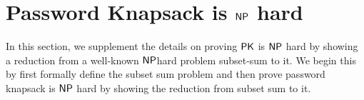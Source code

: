 \vspace{-0.3cm}

\vspace{-0.2in}
\section{Password Knapsack is $\mathsf{NP}$ hard}\label{appendix:pkhardness}

In this section, we supplement the details on proving $\mathsf{PK}$ is $\mathsf{NP}$ hard by showing a reduction from a well-known $\mathsf{NP}$hard problem subset-sum to it. We begin this by first formally define the subset sum problem and then prove password knapsack is $\mathsf{NP}$ hard by showing the reduction from subset sum to it.

